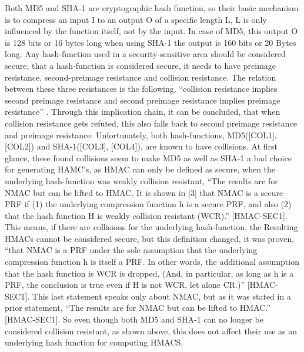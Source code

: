 Both MD5 and SHA-1 are cryptographic hash function, so their basic mechanism is to compress an input I to an output O of a specific length L, L is only influenced by the function itself, not by the input. In case of MD5, this output O is 128 bits or 16 bytes \cite{BAV} long when using SHA-1 the output is 160 bits or 20 Bytes \cite{BAV} long. Any hash-function used in a security-sensitive area should be considered secure, that a hash-function is considered secure, it needs to have preimage resistance, second-preimage resistance and collision resistance. The relation between these three resistances is the following, “collision resistance implies second preimage resistance and second preimage resistance implies preimage resistance” \cite{SPR-res}. Through this implication chain, it can be concluded, that when collision resistance gets refuted, this also falls back to second preimage resistance and preimage resistance. Unfortunately, both hash-functions, MD5([COL1], [COL2]) and SHA-1([COL3], [COL4]), are known to have collisions. At first glance, these found collisions seem to make MD5 as well as SHA-1 a bad choice for generating HAMC's, as HMAC can only be defined as secure, when the underlying hash-function was weakly collision resistant, “The results are for NMAC but can be lifted to HMAC. It is shown in [3] that NMAC is a secure PRF if (1) the underlying compression function h is a secure PRF, and also (2) that the hash function H is weakly collision resistant (WCR).” [HMAC-SEC1]. This means, if there are collisions for the underlying hash-function, the Resulting HMACs cannot be considered secure, but this definition changed, it was proven, “that NMAC is a PRF under the sole assumption that the underlying compression function h is itself a PRF. In other words, the additional assumption that the hash function is WCR is dropped. (And, in particular, as long as h is a PRF, the conclusion is true even if H is not WCR, let alone CR.)” [HMAC-SEC1]. This last statement speaks only about NMAC, but as it was stated in a prior statement, “The results are for NMAC but can be lifted to HMAC.” [HMAC-SEC1]. So even though both MD5 and SHA-1 can no longer be considered collision resistant, as shown above, this does not affect their use as an underlying hash function for computing HMACS. \\
